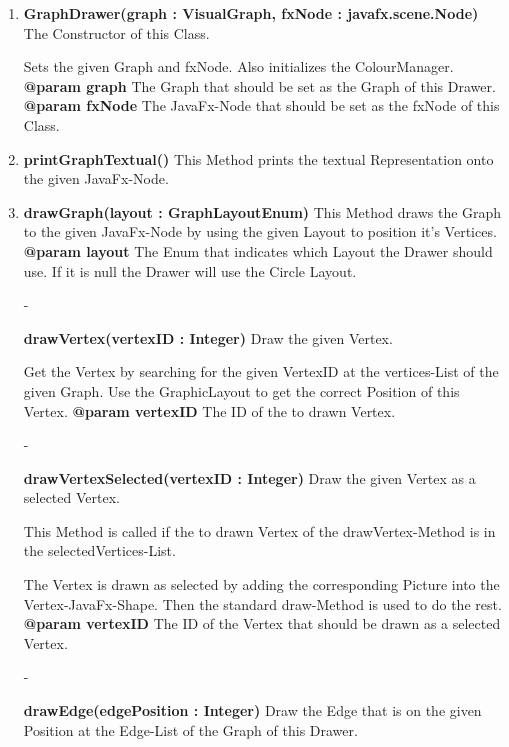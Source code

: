 \documentclass{article}
\begin{document}
				\begin{enumerate}[+]
					\item{
						\textbf{GraphDrawer(graph : VisualGraph, fxNode : javafx.scene.Node)} \newline
						The Constructor of this Class.
						
						Sets the given Graph and fxNode.
						Also initializes the ColourManager.
						\newline
						\textbf{@param graph}
							The Graph that should be set as the Graph of this Drawer.
							\newline
						\textbf{@param fxNode}
							The JavaFx-Node that should be set as the fxNode of this Class.
							\newline
					}
					\item{
						\textbf{printGraphTextual()} \newline
						This Method prints the textual Representation onto the given JavaFx-Node.
						\newline
					}
					\item{
						\textbf{drawGraph(layout : GraphLayoutEnum)} \newline
						This Method draws the Graph to the given JavaFx-Node by using the given Layout to position it's Vertices.
						\newline
						\textbf{@param layout}
							The Enum that indicates which Layout the Drawer should use.
							If it is null the Drawer will use the Circle Layout.
							\newline
					}
					\item[-]{
						\textbf{drawVertex(vertexID : Integer)} \newline
						Draw the given Vertex.
						
						Get the Vertex by searching for the given VertexID at the vertices-List of the given Graph.
						Use the GraphicLayout to get the correct Position of this Vertex.
						\newline
						\textbf{@param vertexID}
							The ID of the to drawn Vertex.
							\newline
					}
					\item[-]{
						\textbf{drawVertexSelected(vertexID : Integer)} \newline
						Draw the given Vertex as a selected Vertex.
						
						This Method is called if the to drawn Vertex of the drawVertex-Method is in the selectedVertices-List.
						
						The Vertex is drawn as selected by adding the corresponding Picture into the Vertex-JavaFx-Shape.
						Then the standard draw-Method is used to do the rest.
						\newline
						\textbf{@param vertexID}
						The ID of the Vertex that should be drawn as a selected Vertex.
						\newline
					}
					\item[-]{
						\textbf{drawEdge(edgePosition : Integer)} \newline
						Draw the Edge that is on the given Position at the Edge-List of the Graph of this Drawer.
						
}
\end{enumerate}
\end{document}
